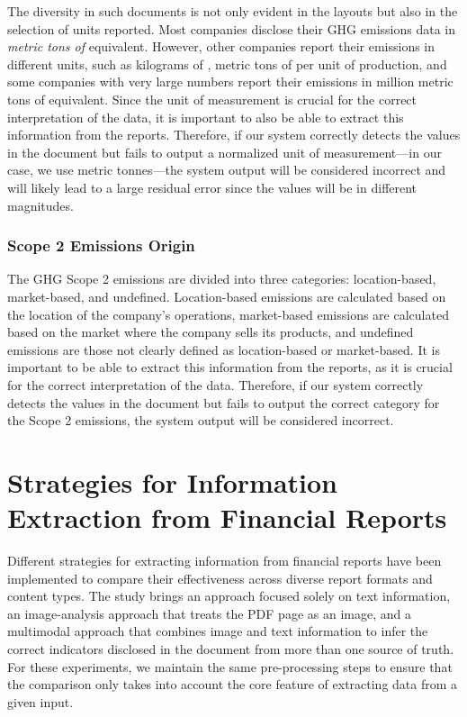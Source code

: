 \documentclass[english, 12pt, a4paper, elec, utf8, a-2b, online]{aaltothesis}
\begin{document}
The diversity in such documents is not only evident in the layouts but also in the selection of units reported.
Most companies disclose their \ac{GHG} emissions data in \textit{metric tons of } equivalent.
However, other companies report their emissions in different units, such as kilograms of , metric tons of  per unit of production, and some companies with very large numbers report their emissions in million metric tons of  equivalent.
Since the unit of measurement is crucial for the correct interpretation of the data, it is important to also be able to extract this information from the reports.
Therefore, if our system correctly detects the values in the document but fails to output a normalized unit of measurement—in our case, we use metric tonnes—the system output will be considered incorrect and will likely lead to a large residual error since the values will be in different magnitudes.

\subsubsection{Scope 2 Emissions Origin}

The \ac{GHG} Scope 2 emissions are divided into three categories: location-based, market-based, and undefined.
Location-based emissions are calculated based on the location of the company's operations, market-based emissions are calculated based on the market where the company sells its products, and undefined emissions are those not clearly defined as location-based or market-based.
It is important to be able to extract this information from the reports, as it is crucial for the correct interpretation of the data.
Therefore, if our system correctly detects the values in the document but fails to output the correct category for the Scope 2 emissions, the system output will be considered incorrect.

\clearpage

\section{Strategies for Information Extraction from Financial Reports}

Different strategies for extracting information from financial reports have been implemented to compare their effectiveness across diverse report formats and content types.
The study brings an approach focused solely on text information, an image-analysis approach that treats the \ac{PDF} page as an image, and a multimodal approach that combines image and text information to infer the correct indicators disclosed in the document from more than one source of truth.
For these experiments, we maintain the same pre-processing steps to ensure that the comparison only takes into account the core feature of extracting data from a given input.
\end{document}
